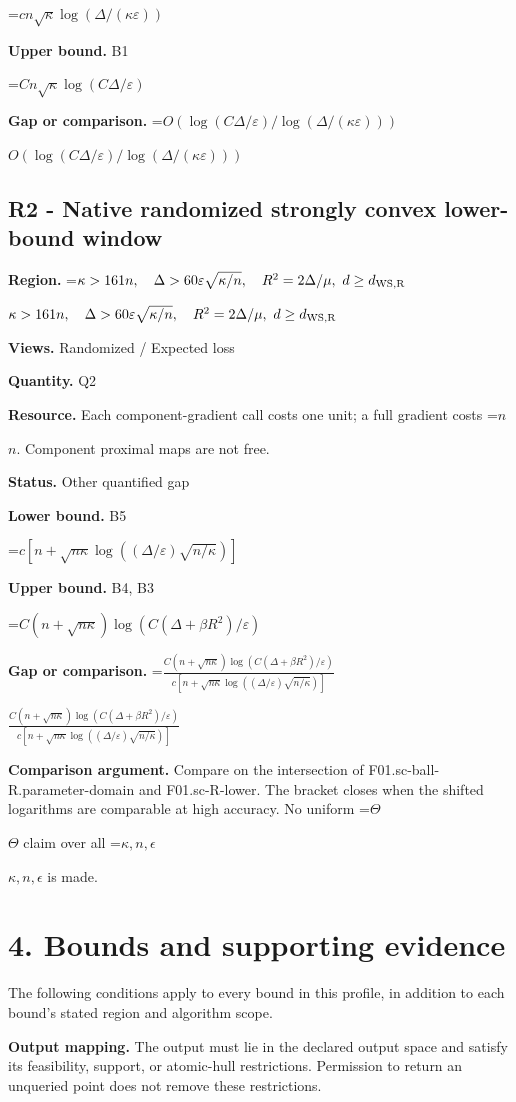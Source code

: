 \documentclass[10pt,a4paper]{article}
\newcommand{\AtlasMath}[1]{\par\begingroup\centering\setbox0=\hbox{$\displaystyle #1$}\ifdim\wd0>1.4\linewidth\typeout{ATLAS WIDE FORMULA: \the\wd0}\fi\ifdim\wd0>\linewidth\resizebox{\linewidth}{!}{\box0}\else\box0\fi\par\endgroup}
\newcommand{\AtlasInlineMath}[1]{\begingroup\setbox0=\hbox{$#1$}\ifdim\wd0>.4\linewidth\endgroup\AtlasMath{#1}\else\endgroup$#1$\fi}
\begin{document}
\AtlasMath{cn\sqrt\kappa\log(\Delta/(\kappa\varepsilon))}
\textbf{Upper bound.} B1

\AtlasMath{Cn\sqrt\kappa\log(C\Delta/\varepsilon)}
\textbf{Gap or comparison.} \AtlasInlineMath{O(\log(C\Delta/\varepsilon)/\log(\Delta/(\kappa\varepsilon)))}

\subsection{R2 - Native randomized strongly convex lower-bound window}
\textbf{Region.} \AtlasInlineMath{\kappa>161n,\quad\Delta>60\varepsilon\sqrt{\kappa/n},\quad R^2=2\Delta/\mu,\ d\ge d_{\rm WS,R}}

\textbf{Views.} Randomized / Expected loss

\textbf{Quantity.} Q2

\textbf{Resource.} Each component-gradient call costs one unit; a full gradient costs \AtlasInlineMath{n}. Component proximal maps are not free.

\textbf{Status.} Other quantified gap

\textbf{Lower bound.} B5

\AtlasMath{c[n+\sqrt{n\kappa}\log((\Delta/\varepsilon)\sqrt{n/\kappa})]}
\textbf{Upper bound.} B4, B3

\AtlasMath{C(n+\sqrt{n\kappa})\log(C(\Delta+\beta R^2)/\varepsilon)}
\textbf{Gap or comparison.} \AtlasInlineMath{\frac{C(n+\sqrt{n\kappa})\log(C(\Delta+\beta R^2)/\varepsilon)}{c[n+\sqrt{n\kappa}\log((\Delta/\varepsilon)\sqrt{n/\kappa})]}}

\textbf{Comparison argument.} Compare on the intersection of F01.sc-ball-R.parameter-domain and F01.sc-R-lower. The bracket closes when the shifted logarithms are comparable at high accuracy. No uniform \AtlasInlineMath{\Theta} claim over all \AtlasInlineMath{\kappa,n,\epsilon} is made.

\section{4. Bounds and supporting evidence}
The following conditions apply to every bound in this profile, in addition to each bound's stated region and algorithm scope.

\textbf{Output mapping.} The output must lie in the declared output space and satisfy its feasibility, support, or atomic-hull restrictions. Permission to return an unqueried point does not remove these restrictions.
\end{document}
